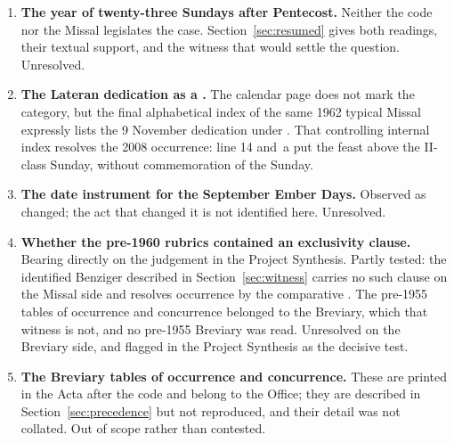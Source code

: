 \begin{enumerate}[leftmargin=1.6em, itemsep=0.35em]
\item \textbf{The year of twenty-three Sundays after Pentecost.} Neither the code nor the Missal
legislates the case. Section~\ref{sec:resumed} gives both readings, their textual support, and
the witness that would settle the question. Unresolved.
\item \textbf{The Lateran dedication as a .} The calendar page does not
mark the category, but the final alphabetical index of the same 1962 typical Missal expressly
lists the 9 November dedication under . That controlling internal index
resolves the 2008 occurrence: line 14 and \,a put the feast above the II-class Sunday,
without commemoration of the Sunday.
\item \textbf{The date instrument for the September Ember Days.} Observed as changed; the act
that changed it is not identified here. Unresolved.
\item \textbf{Whether the pre-1960 rubrics contained an exclusivity clause.} Bearing directly on
the judgement in the Project Synthesis. Partly tested: the identified Benziger 
described in Section~\ref{sec:witness} carries no such clause on the Missal side and resolves
occurrence by the comparative . The pre-1955 tables of occurrence and
concurrence belonged to the Breviary, which that witness is not, and no pre-1955 Breviary was
read. Unresolved on the Breviary side, and flagged in the Project Synthesis as the decisive test.
\item \textbf{The Breviary tables of occurrence and concurrence.} These are printed in the Acta
after the code and belong to the Office; they are described in Section~\ref{sec:precedence} but
not reproduced, and their detail was not collated. Out of scope rather than contested.
\end{enumerate}
